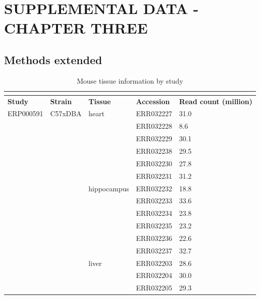 
\chapter{\uppercase {Supplemental Data - Chapter Three}}
\section{Methods extended}
\begin{longtabu} {X[0.9,c]X[1.1,l]X[1.2,l]X[1,l]X[1,c]}
  \caption{Mouse tissue information by study}\\
  \label{tableC:1}\\
  \toprule
  \textbf{Study} & \textbf{Strain} & \textbf{Tissue} & \textbf{Accession} & \textbf{Read count (million)}\\
  \midrule
  \endhead
  ERP000591 & C57xDBA    & heart        & ERR032227 & 31.0\\
            &            &              & ERR032228 & 8.6 \\
            &            &              & ERR032229 & 30.1\\
            &            &              & ERR032238 & 29.5\\
            &            &              & ERR032230 & 27.8\\
            &            &              & ERR032231 & 31.2\\
            &            & hippocampus  & ERR032232 & 18.8\\
            &            &              & ERR032233 & 33.6\\
            &            &              & ERR032234 & 23.8\\
            &            &              & ERR032235 & 23.2\\
            &            &              & ERR032236 & 22.6\\
            &            &              & ERR032237 & 32.7\\
            &            & liver        & ERR032203 & 28.6\\
            &            &              & ERR032204 & 30.0\\
            &            &              & ERR032205 & 29.3\\

\end{longtabu}

